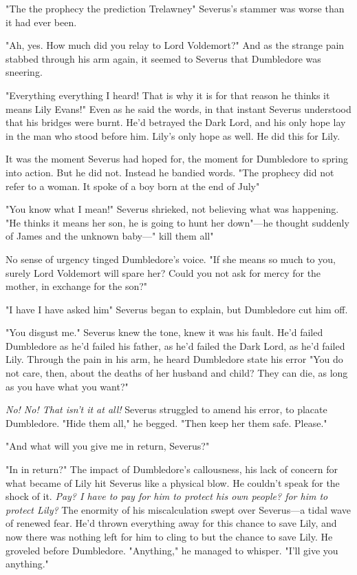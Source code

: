 "The{\el} the prophecy{\el} the prediction{\el} Trelawney{\el}" Severus's stammer was worse than it had ever been.

"Ah, yes. How much did you relay to Lord Voldemort?" And as the strange pain stabbed through his arm again, it seemed to Severus that Dumbledore was sneering.

"Everything{\el} everything I heard! That is why{\el} it is for that reason{\el} he thinks it means Lily Evans!" Even as he said the words, in that instant Severus understood that his bridges were burnt. He'd betrayed the Dark Lord, and his only hope lay in the man who stood before him. Lily's only hope as well. He did this for Lily.

It was the moment Severus had hoped for, the moment for Dumbledore to spring into action. But he did not. Instead he bandied words. "The prophecy did not refer to a woman. It spoke of a boy born at the end of July{\el}"

"You know what I mean!" Severus shrieked, not believing what was happening. "He thinks it means her son, he is going to hunt her down{\el}"—he thought suddenly of James and the unknown baby—"{\el} kill them all{\el}"

No sense of urgency tinged Dumbledore's voice. "If she means so much to you, surely Lord Voldemort will spare her? Could you not ask for mercy for the mother, in exchange for the son?"

"I have{\el} I have asked him{\el}" Severus began to explain, but Dumbledore cut him off.

"You disgust me." Severus knew the tone, knew it was his fault. He'd failed Dumbledore as he'd failed his father, as he'd failed the Dark Lord, as he'd failed Lily. Through the pain in his arm, he heard Dumbledore state his error{\el} "You do not care, then, about the deaths of her husband and child? They can die, as long as you have what you want?"

\emph{No! No! That isn't it at all!} Severus struggled to amend his error, to placate Dumbledore. "Hide them all," he begged. "Then{\el} keep her{\el} them{\el} safe. Please."

"And what will you give me in return, Severus?"

"In{\el} in return?" The impact of Dumbledore's callousness, his lack of concern for what became of Lily hit Severus like a physical blow. He couldn't speak for the shock of it. \emph{Pay? I have to pay for him to protect his own people? for him to protect Lily?} The enormity of his miscalculation swept over Severus—a tidal wave of renewed fear. He'd thrown everything away for this chance to save Lily, and now there was nothing left for him to cling to but the chance to save Lily. He groveled before Dumbledore. "Anything," he managed to whisper. "I'll give you anything."


